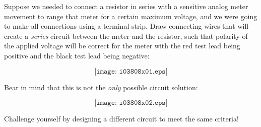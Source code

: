 

Suppose we needed to connect a resistor in series with a sensitive analog meter movement to range that meter for a certain maximum voltage, and we were going to make all connections using a terminal strip.  Draw connecting wires that will create a {\it series} circuit between the meter and the resistor, such that polarity of the applied voltage will be correct for the meter with the red test lead being positive and the black test lead being negative:

$$\texttt{[image: i03808x01.eps]}$$







Bear in mind that this is not the {\it only} possible circuit solution:

$$\texttt{[image: i03808x02.eps]}$$

Challenge yourself by designing a different circuit to meet the same criteria! 










